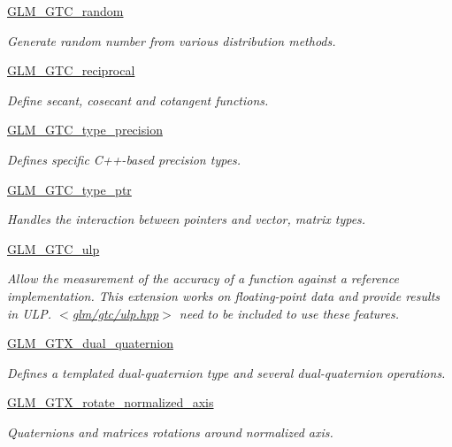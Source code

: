 \begin{DoxyCompactItemize}
\hyperlink{group__gtc__random}{G\+L\+M\+\_\+\+G\+T\+C\+\_\+random}
\begin{DoxyCompactList}\small\item\em Generate random number from various distribution methods. \end{DoxyCompactList}\item 
\hyperlink{group__gtc__reciprocal}{G\+L\+M\+\_\+\+G\+T\+C\+\_\+reciprocal}
\begin{DoxyCompactList}\small\item\em Define secant, cosecant and cotangent functions. \end{DoxyCompactList}\item 
\hyperlink{group__gtc__type__precision}{G\+L\+M\+\_\+\+G\+T\+C\+\_\+type\+\_\+precision}
\begin{DoxyCompactList}\small\item\em Defines specific C++-\/based precision types. \end{DoxyCompactList}\item 
\hyperlink{group__gtc__type__ptr}{G\+L\+M\+\_\+\+G\+T\+C\+\_\+type\+\_\+ptr}
\begin{DoxyCompactList}\small\item\em Handles the interaction between pointers and vector, matrix types. \end{DoxyCompactList}\item 
\hyperlink{group__gtc__ulp}{G\+L\+M\+\_\+\+G\+T\+C\+\_\+ulp}
\begin{DoxyCompactList}\small\item\em Allow the measurement of the accuracy of a function against a reference implementation. This extension works on floating-\/point data and provide results in U\+LP. $<$\hyperlink{gtc_2ulp_8hpp}{glm/gtc/ulp.\+hpp}$>$ need to be included to use these features. \end{DoxyCompactList}\item 
\hyperlink{group__gtc__dual__quaternion}{G\+L\+M\+\_\+\+G\+T\+X\+\_\+dual\+\_\+quaternion}
\begin{DoxyCompactList}\small\item\em Defines a templated dual-\/quaternion type and several dual-\/quaternion operations. \end{DoxyCompactList}\item 
\hyperlink{group__gtx__rotate__normalized__axis}{G\+L\+M\+\_\+\+G\+T\+X\+\_\+rotate\+\_\+normalized\+\_\+axis}
\begin{DoxyCompactList}\small\item\em Quaternions and matrices rotations around normalized axis. \end{DoxyCompactList}\end{DoxyCompactItemize}


